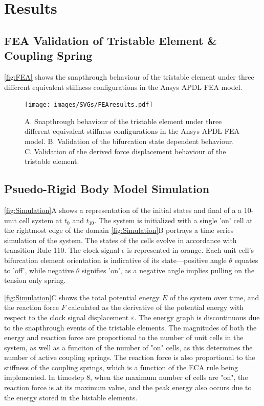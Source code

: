 \section{Results}


\subsection*{FEA Validation of Tristable Element \& Coupling Spring}

\autoref*{fig:FEA} shows the snapthrough behaviour of the tristable element under three different equivalent stiffness configurations in the Ansys APDL FEA model. 

\begin{figure}[H]
    \centering
    \texttt{[image: images/SVGs/FEAresults.pdf]}
    \caption{A. Snapthrough behaviour of the tristable element under three different equivalent stiffness configurations in the Ansys APDL FEA model. B. Validation of the bifurcation state dependent behaviour. C. Validation of the derived force displacement behaviour of the tristable element.}
    \label{fig:FEA}
\end{figure}


\subsection*{Psuedo-Rigid Body Model Simulation}

\autoref*{fig:Simulation}A shows a representation of the initial states and final of a a 10-unit cell system at \(t_0\) and \(t_{10}\). The system is initialized with a single 'on' cell at the rightmost edge of the domain
\autoref*{fig:Simulation}B portrays a time series simulation of the system. The states of the cells evolve in accordance with transition Rule 110. The clock signal \( \epsilon \) is represented in orange. Each unit cell's bifurcation element orientation is indicative of its state—positive angle \( \theta \) equates to 'off', while negative \( \theta \) signifies 'on', as a negative angle implies pulling on the tension only spring. 

\autoref*{fig:Simulation}C shows the total potential energy \(E\) of the system over time, and the reaction force \(F\) calculated as the derivative of the potential energy with respect to the clock signal displacement \(\varepsilon\). The energy graph is discontinuous due to the snapthrough events of the tristable elements. The magnitudes of both the energy and reaction force are proportional to the number of unit cells in the system, as well as a funciton of the number of "on" cells, as this determines the number of active coupling springs. The reaction force is also proportional to the stiffness of the coupling springs, which is a function of the ECA rule being implemented. In timestep 8, when the maximum number of cells are "on", the reaction force is at its maximum value, and the peak energy also occurs due to the energy stored in the bistable elements. 





